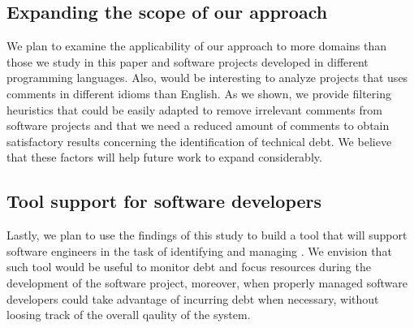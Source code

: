 \subsection{Expanding the scope of our approach}

We plan to examine the applicability of our approach to more domains than those we study in this paper and software projects developed in different programming languages. Also, would be interesting to analyze projects that uses comments in different idioms than English. As we shown, we provide filtering heuristics that could be easily adapted to remove irrelevant comments from software projects and that we need a reduced amount of comments to obtain satisfactory results concerning the identification of technical debt. We believe that these factors will help future work to expand considerably. 

\subsection{Tool support for software developers}

Lastly, we plan to use the findings of this study to build a tool that will support software engineers in the task of identifying and managing \SATD. We envision that such tool would be useful to monitor debt and focus resources during the development of the software project, moreover, when properly managed software developers could take advantage of incurring debt when necessary, without loosing track of the overall qaulity of the system.

